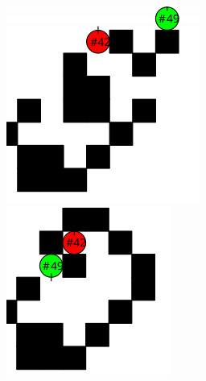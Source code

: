 \begin{figure}[!htb]
      \includegraphics[width=\linewidth]{one.png}
    \endminipage\hfill
      \includegraphics[width=\linewidth]{two.png}

\end{figure}
